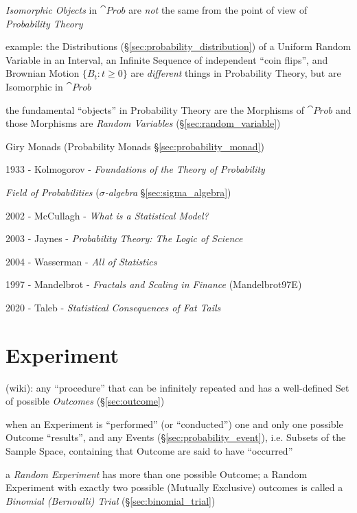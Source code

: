\emph{Isomorphic Objects} in $\cat{Prob}$ are \emph{not} the same from the point
of view of \emph{Probability Theory}

example: the Distributions (\S\ref{sec:probability_distribution}) of a Uniform
Random Variable in an Interval, an Infinite Sequence of independent ``coin
flips'', and Brownian Motion $\{B_t : t \geq 0\}$ are \emph{different} things in
Probability Theory, but are Isomorphic in $\cat{Prob}$

the fundamental ``objects'' in Probability Theory are the Morphisms of
$\cat{Prob}$ and those Morphisms are \emph{Random Variables}
(\S\ref{sec:random_variable})

\fist Giry Monads (Probability Monads \S\ref{sec:probability_monad})

\asterism

1933 - Kolmogorov - \emph{Foundations of the Theory of Probability}

\emph{Field of Probabilities} (\emph{$\sigma$-algebra}
\S\ref{sec:sigma_algebra})

\asterism

2002 - McCullagh - \emph{What is a Statistical Model?}

2003 - Jaynes - \emph{Probability Theory: The Logic of Science}

2004 - Wasserman - \emph{All of Statistics}

\asterism

1997 - Mandelbrot - \emph{Fractals and Scaling in Finance} (Mandelbrot97E)

2020 - Taleb - \emph{Statistical Consequences of Fat Tails}



\section{Experiment}\label{sec:experiment}

(wiki): any ``procedure'' that can be infinitely repeated and has a well-defined
Set of possible \emph{Outcomes} (\S\ref{sec:outcome})

when an Experiment is ``performed'' (or ``conducted'') one and only one possible
Outcome ``results'', and any Events (\S\ref{sec:probability_event}), i.e.
Subsets of the Sample Space, containing that Outcome are said to have
``occurred''

a \emph{Random Experiment} has more than one possible Outcome; a Random
Experiment with exactly two possible (Mutually Exclusive) outcomes is called a
\emph{Binomial (Bernoulli) Trial} (\S\ref{sec:binomial_trial})

